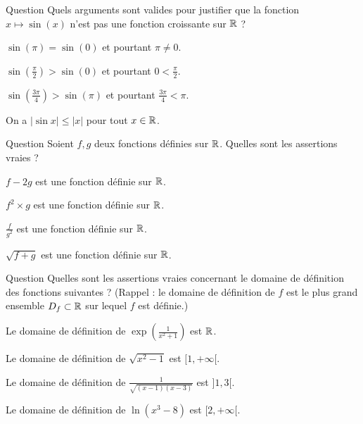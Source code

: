 

\begin{multi}[multiple,feedback=
{Une fonction \(f\) est croissante si \(x \le y\) implique \(f(x) \le f(y)\).
Donc une fonction n'est pas croissante si on peut trouver \(x \le y\) mais avec
\(f(x) > f(y)\). Le seul argument valable est donc \(\frac{3\pi}{4} < \pi\) avec \(\sin(\frac{3\pi}{4}) > \sin(\pi)\).
}]{Question}
Quels arguments sont valides pour justifier que la fonction \(x \mapsto \sin(x)\) n'est pas une fonction croissante sur \(\Rr\) ?

    \item \(\sin(\pi) = \sin(0)\) et pourtant \(\pi \neq 0\).
    \item \(\sin(\frac\pi2) > \sin(0)\) et pourtant \(0 < \frac\pi2\).
    \item* \(\sin(\frac{3\pi}{4}) > \sin(\pi)\) et pourtant \(\frac{3\pi}{4} < \pi\).
    \item On a \(|\sin x| \le |x|\) pour tout \(x\in\mathbb{R}\).
\end{multi}


\begin{multi}[multiple,feedback=
{La somme et le produit de fonctions est définie partout. Par contre pour le quotient il faut que le dénominateur ne s'annule pas. Pour une racine carrée, il faut que le terme sous la racine soit positif ou nul.
}]{Question}
Soient \(f,g\) deux fonctions définies sur \(\Rr\). Quelles sont les assertions vraies ?

    \item* \(f-2g\) est une fonction définie sur \(\Rr\).
    \item* \(f^2 \times g\) est une fonction définie sur \(\Rr\).
    \item \(\frac{f}{g^2}\) est une fonction définie sur \(\Rr\).
    \item \(\sqrt{f+g}\) est une fonction définie sur \(\Rr\).
\end{multi}


\begin{multi}[multiple,feedback=
{\(\frac 1x\) est définie pour \(x\neq 0\), \(\sqrt{x}\) est définie pour \(x \ge 0\) ; \(\exp x\) est définie sur \(\Rr\) ; \(\ln x\) seulement pour \(x>0\).
}]{Question}
Quelles sont les assertions vraies concernant le domaine de définition des fonctions suivantes ? (Rappel : le domaine de définition de \(f\) est le plus grand ensemble \(D_f \subset \mathbb{R}\) sur lequel \(f\) est définie.)

    \item* Le domaine de définition de \(\exp(\frac{1}{x^2+1})\) est \(\Rr\).
    \item Le domaine de définition de \(\sqrt{x^2-1}\) est \([1,+\infty[\).
    \item Le domaine de définition de \(\frac{1}{\sqrt{(x-1)(x-3)}}\) est \(]1,3[\).
    \item Le domaine de définition de \(\ln(x^3-8)\) est \([2,+\infty[\).
\end{multi}


